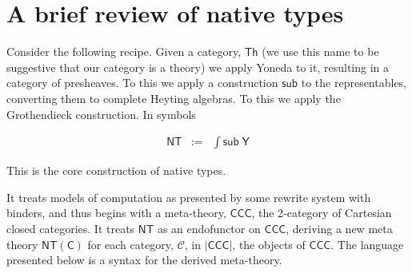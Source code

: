 \section{A brief review of native types}
Consider the following recipe. Given a category, $\mathsf{Th}$ (we use this name to be suggestive that our category is a theory) we apply Yoneda
to it, resulting in a category of presheaves. To this we apply a
construction $\mathsf{sub}$ to the representables, converting them to
complete Heyting algebras. To this we apply the Grothendieck
construction. In symbols

\begin{eqnarray}
  \mathsf{NT} & := & \int \mathsf{sub} \; \mathsf{Y} \nonumber
\end{eqnarray}

This is the core construction of native types.

It treats models of computation as presented by some rewrite system
with binders, and thus begins with a meta-theory, $\mathsf{CCC}$, the
2-category of Cartesian closed categories. It treats $\mathsf{NT}$ as
an endofunctor on $\mathsf{CCC}$, deriving a new meta theory
$\mathsf{NT(C)}$ for each category, $\mathcal{C}$, in $\mathsf{|CCC|}$, the
objects of $\mathsf{CCC}$. The language presented below is a syntax
for the derived meta-theory.
